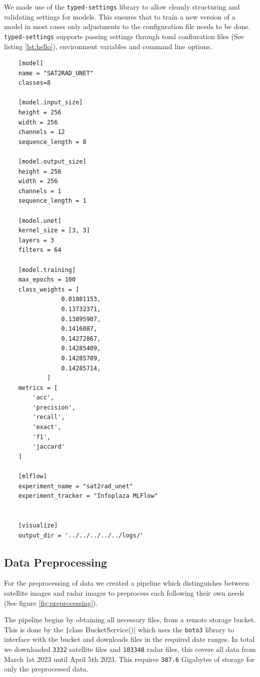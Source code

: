 We made use of the \texttt{typed-settings} library to allow cleanly structuring and validating settings for models.
This ensures that to train a new version of a model in most cases only adjustments to the configuration file needs to be done.
\texttt{typed-settings} supports passing settings through toml confiuration files (See listing \ref{lst:hello}), environment variables and command line options.

\begin{listing}
  \begin{verbatim}
    [model]
    name = "SAT2RAD_UNET"
    classes=8
    
    [model.input_size]
    height = 256
    width = 256
    channels = 12
    sequence_length = 8
    
    [model.output_size]
    height = 256
    width = 256
    channels = 1
    sequence_length = 1
    
    [model.unet]
    kernel_size = [3, 3]
    layers = 3
    filters = 64
    
    [model.training]
    max_epochs = 100
    class_weights = [
                0.01081153,
                0.13732371,
                0.13895907,
                0.1416087,
                0.14272867,
                0.14285409,
                0.14285709,
                0.14285714,
            ]
    metrics = [
        'acc',
        'precision',
        'recall',
        'exact',
        'f1', 
        'jaccard'
    ]
    
    [mlflow]
    experiment_name = "sat2rad_unet"
    experiment_tracker = "Infoplaza MLFlow"
    
    
    [visualize]
    output_dir = '../../../../../logs/'
  \end{verbatim}
  \caption{toml configuration file for U-Net Model.}
  \label{lst:hello}
\end{listing}

\subsection{Data Preprocessing}

For the preprocessing of data we created a pipeline which distinguishes between satellite images and radar images to preprocess each following their own needs (See figure \ref{fig:preprocessing}).

The pipeline begins by obtaining all necessary files, from a remote storage bucket.
This is done by the \texttt|class BucketService()| which uses the \texttt{boto3}
library to interface with the bucket and downloads files in the required date ranges. In total we downloaded \texttt{3332} satellite files and \texttt{103348} radar files, this covers
all data from March 1st 2023 until April 5th 2023. This requires \texttt{387.6} Gigabytes of storage for only the preprocessed data.

